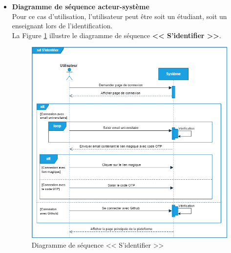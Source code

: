 \begin{itemize}[itemsep=1pt, parsep=1pt]
    
    \item \textbf{Diagramme de séquence acteur-système}\\
     Pour ce cas d'utilisation, l'utilisateur peut être soit un étudiant, soit un enseignant lors de l'identification.\\
     La Figure \ref{fig:diagramme de séquence << S’identifier >>} illustre le diagramme de séquence \textbf{<< S’identifier >>}.
     \begin{figure}[H]
        \centering
        \includegraphics[width=1.1\textwidth,height=0.85\textheight]{images/chp3/fig6.png}
        \caption{Diagramme de séquence << S’identifier >>}        
        \label{fig:diagramme de séquence << S’identifier >>}    
    \end{figure}

\end{itemize}

